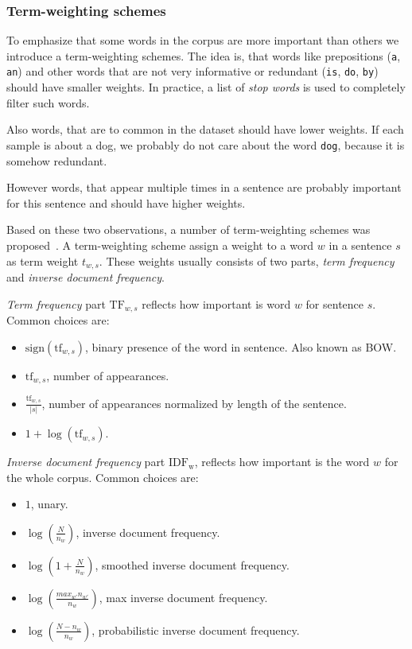     
    \subsubsection{Term-weighting schemes} \label{sec:term:weights}
    
    To emphasize that some words in the corpus are more important than others we introduce a term-weighting schemes. 
    The idea is, that words like prepositions (\texttt{a}, \texttt{an}) and other words that are not very informative or redundant (\texttt{is}, \texttt{do}, \texttt{by}) should have smaller weights. 
    In practice, a list of \textit{stop words} is used to completely filter such words.
    
    Also words, that are to common in the dataset should have lower weights.
    If each sample is about a dog, we probably do not care about the word \texttt{dog}, because it is somehow redundant.
    
    However words, that appear multiple times in a sentence are probably important for this sentence and should have higher weights.
    
    Based on these two observations, a number of term-weighting schemes was proposed~\cite{salton1988term}.
    A term-weighting scheme assign a weight to a word $w$ in a sentence $s$ as term weight $t_{w,s}$.
    These weights usually consists of two parts, \emph{term frequency} and \emph{inverse document frequency}. 
    
    \emph{Term frequency} part $\mathrm{TF}_{w,s}$ reflects how important is word $w$ for sentence $s$.
    Common choices are:
    \begin{itemize}
        \item $\mathrm{sign}(\mathrm{tf}_{w,s})$, binary presence of the word in sentence. Also known as BOW.
        \item $\mathrm{tf}_{w,s}$, number of appearances.
        \item $\frac{\mathrm{tf}_{w,s}}{|s|}$, number of appearances normalized by length of the sentence.
        \item $1+\log(\mathrm{tf}_{w,s})$.
    \end{itemize}
    
    \emph{Inverse document frequency} part $\mathrm{IDF_w}$, reflects how important is the word $w$ for the whole corpus.
    Common choices are:
    \begin{itemize}
        \item $1$, unary.
        \item $\log \left(\frac{N}{n_w} \right)$, inverse document frequency.
        \item $\log \left( 1+\frac{N}{n_w} \right)$, smoothed inverse document frequency.
        \item $\log \left( \frac{max_{w'} n_{w'}}{n_w} \right)$, max inverse document frequency.
        \item $\log \left(\frac{N-n_w}{n_w} \right)$, probabilistic inverse document frequency.
    \end{itemize}

